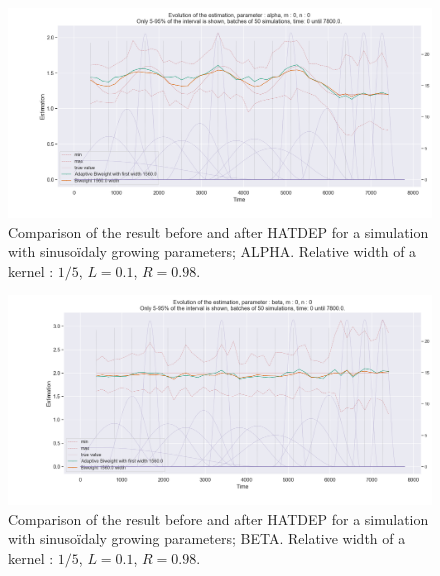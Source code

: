 \begin{figure}
\centering
\includegraphics[width = 0.90 \textwidth]{../imag/chap3/4/M.png}
\caption{Comparison of the result before and after HATDEP for a simulation with sinusoïdaly growing parameters; ALPHA. Relative width of a kernel : $1/5$, $L = 0.1$, $R = 0.98$.}
\label{fig:first_estimate_4_alpha}
\end{figure}

\begin{figure}
\centering
\includegraphics[width = 0.90 \textwidth]{../imag/chap3/4/N.png}
\caption{Comparison of the result before and after HATDEP for a simulation with sinusoïdaly growing parameters; BETA. Relative width of a kernel : $1/5$, $L = 0.1$, $R = 0.98$.}
\label{fig:first_estimate_4_beta}
\end{figure}

